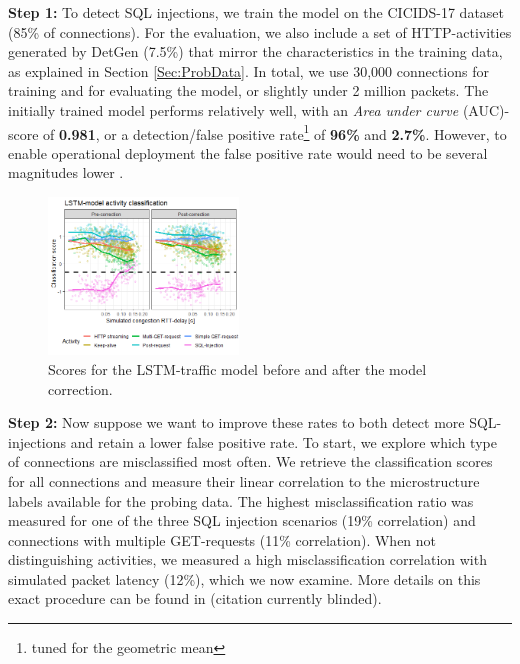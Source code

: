 \documentclass[conference]{IEEEtran}
\begin{document}

\textbf{Step 1:} To detect SQL injections, we train the model on the CICIDS-17 dataset \cite{sharafaldin2018toward} (85\% of connections).
For the evaluation, we also include a set of HTTP-activities generated by DetGen (7.5\%) that mirror the characteristics in the training data, as explained in Section \ref{Sec:ProbData}. %
In total, we use 30,000 connections for training and for evaluating the model, or slightly under 2 million packets.
The initially trained model performs relatively well, with an \textit{Area under curve} (AUC)-score %
 of \textbf{0.981}, or a detection/false positive rate\footnote{tuned for the geometric mean} of \textbf{96\%} and \textbf{2.7\%}. However, to enable operational deployment the false positive rate would need to be several magnitudes lower \cite{mell2003overview}. 


\begin{figure}
\centering
\includegraphics[width=0.45\textwidth]{images/LSTM_classi.png}
\caption{Scores for the LSTM-traffic model before and after the model correction.}\label{fig:LSTM_exp}
\end{figure}


\textbf{Step 2:} Now suppose we want to improve these rates to both detect more SQL-injections and retain a lower false positive rate. To start, we explore which type of connections are misclassified most often. We retrieve the classification scores for all connections and measure their linear correlation to the microstructure labels available for the probing data. The highest misclassification ratio was measured for one of the three SQL injection scenarios (19\% correlation) and connections with multiple GET-requests (11\% correlation). When not distinguishing activities, we measured a high misclassification correlation with simulated packet latency (12\%), which we now examine. More details on this exact procedure can be found in (citation currently blinded).
\end{document}
